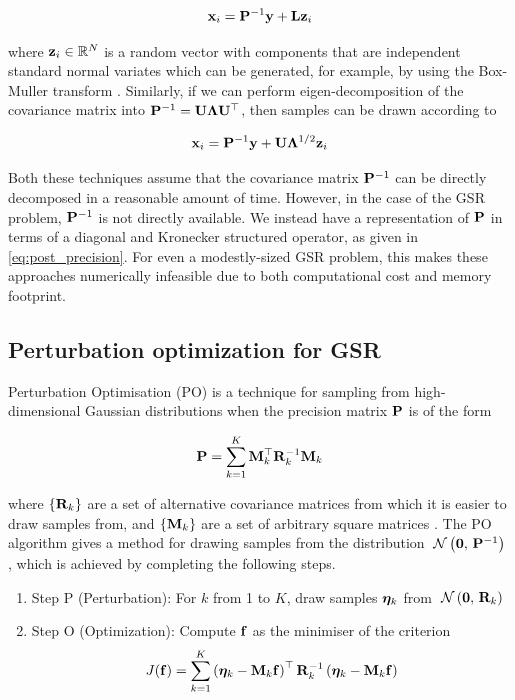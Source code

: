 \begin{equation}
    \label{eq:post_precision}
    \mathbf{x}_i = \mathbf{P}^{-1} \mathbf{y} + \mathbf{L} \mathbf{z}_i
\end{equation}

where $\mathbf{z}_i \in \mathbb{R}^N$ is a random vector with components that are independent standard normal variates which can be generated, for example, by using the Box-Muller transform \citep{Box1958}. Similarly, if we can perform eigen-decomposition of the covariance matrix into $\mathbf{P}^{-1} = \mathbf{U} \mathbf{\Lambda} \mathbf{U}^\top$, then samples can be drawn according to

\begin{equation}
    \mathbf{x}_i = \mathbf{P}^{-1} \mathbf{y} + \mathbf{U} \mathbf{\Lambda}^{1/2} \mathbf{z}_i
\end{equation}

Both these techniques assume that the covariance matrix $\mathbf{P}^{-1}$ can be directly decomposed in a reasonable amount of time. However, in the case of the GSR problem, $\mathbf{P}^{-1}$ is not directly available. We instead have a representation of $\mathbf{P}$ in terms of a diagonal and Kronecker structured operator, as given in \cref{eq:post_precision}. For even a modestly-sized GSR problem, this makes these approaches numerically infeasible due to both computational cost and memory footprint. 

\subsection{Perturbation optimization for GSR}

\label{sec:GSR_PO}

Perturbation Optimisation (PO) is a technique for sampling from high-dimensional Gaussian distributions when the precision matrix $\mathbf{P}$ is of the form 

\begin{equation}
    \label{eq:PO_sum}
    \mathbf{P} = \sum_{k=1}^K \mathbf{M}_k^\top \mathbf{R}_k^{-1} \mathbf{M}_k
\end{equation}

where $\left\{\mathbf{R}_k\right\}$ are a set of alternative covariance matrices from which it is easier to draw samples from, and $\left\{\mathbf{M}_k\right\}$ are a set of arbitrary square matrices \citep{Papandreou2010, Orieux2012}. The PO algorithm gives a method for drawing samples from the distribution $\; \mathcal{N}\left(\mathbf{0}, \, \mathbf{P}^{-1}\right) \;$, which is achieved by completing the following steps. 

\begin{enumerate}
    \item Step P (Perturbation): For $k$ from 1 to $K$, draw samples $\boldsymbol{\eta}_k$ from $\; \mathcal{N}\left(\mathbf{0}, \, \mathbf{R}_k\right) \;$
    \item Step O (Optimization): Compute $\mathbf{f}$ as the minimiser of the criterion $$J(\mathbf{f}) = \sum_{k=1}^K \left(\boldsymbol{\eta}_k - \mathbf{M}_k \mathbf{f} \right)^\top \mathbf{R}_k^{-1}\left(\boldsymbol{\eta}_k - \mathbf{M}_k \mathbf{f} \right)$$
\end{enumerate}
 
